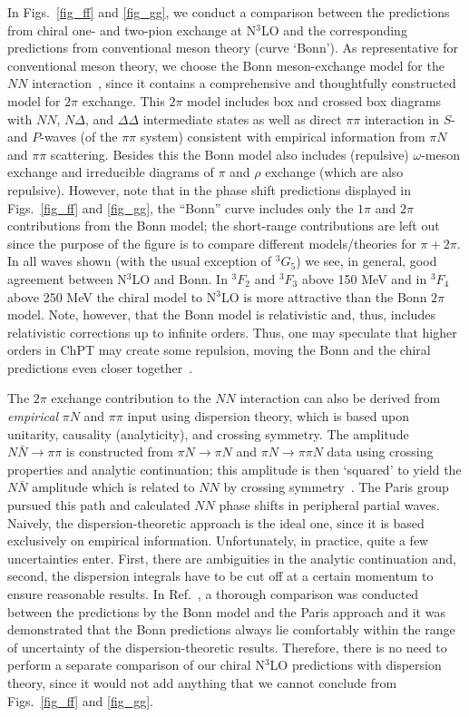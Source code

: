 \documentclass[sort&compress,preprint,3p]{elsarticle}
\begin{document}
In Figs.~\ref{fig_ff} and \ref{fig_gg}, 
we conduct a comparison between the predictions from chiral one- and
two-pion exchange at N$^3$LO and the corresponding 
predictions from conventional
meson theory (curve `Bonn'). 
As representative for conventional meson theory, we choose the Bonn
meson-exchange model for the $NN$ interaction~\cite{MHE87},
since it contains a comprehensive and thoughtfully constructed
model for $2\pi$ exchange.
This $2\pi$ model includes box and crossed box diagrams with
$NN$, $N\Delta$, and $\Delta\Delta$ intermediate states
as well as direct $\pi\pi$ interaction in $S$- and $P$-waves
(of the $\pi\pi$ system)
consistent with empirical information from $\pi N$ and $\pi\pi$
scattering.
Besides this the Bonn model also includes (repulsive) $\omega$-meson
exchange and irreducible diagrams of $\pi$ and $\rho$ exchange
(which are also repulsive).
However, note that
in the phase shift predictions displayed in 
Figs.~\ref{fig_ff} and \ref{fig_gg}, 
the ``Bonn'' curve includes only the $1\pi$ and $2\pi$ contributions
from the Bonn model; the short-range contributions are
left out since the purpose of the figure is to compare
different models/theories for $\pi+2\pi$.
In all waves shown (with the usual exception of $^3G_5$)
we see, in general, good agreement between N$^3$LO and Bonn.
In $^3F_2$ and $^3F_3$ above 150 MeV and in
$^3F_4$ above 250 MeV the chiral model to N$^3$LO is more
attractive than the Bonn $2\pi$ model. Note, however,
that the Bonn model is relativistic and, thus, includes
relativistic corrections up to infinite orders.
Thus, one may speculate that higher orders in 
ChPT may create some
repulsion, moving the Bonn and the chiral predictions even closer
together~\cite{foot2}.


The $2\pi$ exchange contribution to the $NN$ interaction
can also be derived
from {\it empirical} $\pi N$ and $\pi\pi$ input
using dispersion theory, which is based upon unitarity,
causality (analyticity), and crossing symmetry.
The amplitude $N\bar{N}\rightarrow \pi\pi$ is
constructed from $\pi N \rightarrow \pi N$
and $\pi N \rightarrow \pi\pi N$ data using 
crossing properties and analytic
continuation; this amplitude is then `squared' to yield 
the $N\bar{N}$ amplitude 
which is related to $NN$ by crossing symmetry~\cite{BJ76}.
The Paris group~\cite{Vin79,Lac80} pursued this path and 
calculated $NN$ phase shifts in peripheral partial waves.
Naively, the dispersion-theoretic approach is
the ideal one, since it is based exclusively on empirical
information. Unfortunately, in practice,
quite a few uncertainties enter.
First, there are ambiguities
in the analytic continuation and, second, 
the dispersion integrals have to be cut off at a certain
momentum to ensure reasonable results.
In Ref.~\cite{MHE87}, a thorough comparison was conducted
between the predictions by the Bonn model and the
Paris approach and it was demonstrated that the Bonn
predictions always lie comfortably within the range of uncertainty
of the dispersion-theoretic results.
Therefore, there is no need to perform a
separate comparison of our chiral N$^3$LO predictions with
dispersion theory, since it would not add anything that we
cannot conclude from Figs.~\ref{fig_ff} and \ref{fig_gg}.
\end{document}
